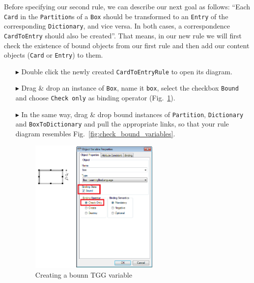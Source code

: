 Before specifying our second rule, we can describe our next goal as follows: ``Each \texttt{Card} in the \texttt{Partition}s of a \texttt{Box} should be transformed to an \texttt{Entry} of the corresponding \texttt{Dictionary}, and vice versa. 
In both cases, a correspondence \texttt{CardToEntry} should also be created''. 
That means, in our new rule we will first check the existence of bound objects from our first rule and then add our content objects (\texttt{Card} or \texttt{Entry}) to them.

\begin{enumerate}
\item[$\blacktriangleright$] Double click the newly created \texttt{CardToEntryRule} to open its diagram.
\item[$\blacktriangleright$] Drag \& drop an instance of \texttt{Box}, name it \texttt{box}, select the checkbox \texttt{Bound} and choose \texttt{Check only} as binding operator (Fig.~\ref{fig:bound_tgg_variable}).
\item[$\blacktriangleright$] In the same way, drag \& drop bound instances of \texttt{Partition}, \texttt{Dictionary} and \texttt{BoxToDictionary} and pull the appropriate links, so that your rule diagram resembles Fig.~\ref{fig:check_bound_variables}.

\begin{figure}[htbp]
\begin{center}
  \includegraphics[width=0.6\textwidth]{pics/tggBilder/tggRule/tgg17}
  \caption{Creating a bounn TGG variable}  
  \label{fig:bound_tgg_variable}
\end{center}
\end{figure}


\end{enumerate}
